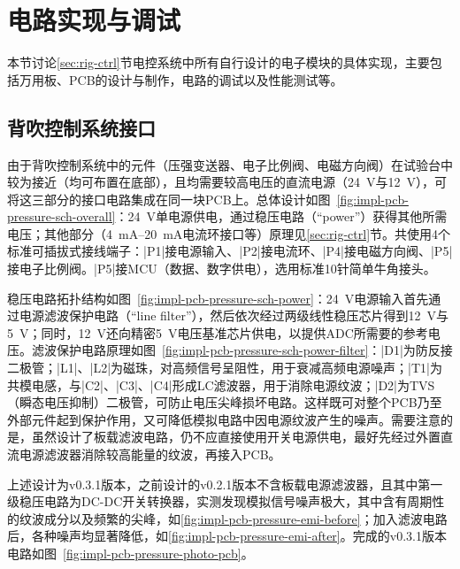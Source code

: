 \clearpage



\section{电路实现与调试}\label{sec:impl-pcb}

本节讨论\ref{sec:rig-ctrl}节电控系统中所有自行设计的电子模块的具体实现，主要包括万用板、PCB的设计与制作，电路的调试以及性能测试等。


\subsection{背吹控制系统接口}\label{sec:impl-pcb-pressure}

由于背吹控制系统中的元件（压强变送器、电子比例阀、电磁方向阀）在试验台中较为接近（均可布置在底部），且均需要较高电压的直流电源（\SI{+24}{\V}与\SI{+12}{\V}），可将这三部分的接口电路集成在同一块PCB上。总体设计如图~\ref{fig:impl-pcb-pressure-sch-overall}：\SI{+24}{\V}单电源供电，通过稳压电路（``power''）获得其他所需电压；其他部分（\SIrange{4}{20}{\mA}电流环接口等）原理见\ref{sec:rig-ctrl}节。共使用4个标准可插拔式接线端子：\bverb|P1|接电源输入、\bverb|P2|接电流环、\bverb|P4|接电磁方向阀、\bverb|P5|接电子比例阀。\bverb|P5|接MCU（数据、数字供电），选用标准10针简单牛角接头。

稳压电路拓扑结构如图~\ref{fig:impl-pcb-pressure-sch-power}：\SI{+24}{\V}电源输入首先通过电源滤波保护电路（``line filter''），然后依次经过两级线性稳压芯片得到\SI{+12}{\V}与\SI{+5}{\V}；同时，\SI{+12}{\V}还向精密\SI{+5}{\V}电压基准芯片供电，以提供ADC所需要的参考电压。滤波保护电路原理如图~\ref{fig:impl-pcb-pressure-sch-power-filter}：\bverb|D1|为防反接二极管；\bverb|L1|、\bverb|L2|为磁珠，对高频信号呈阻性，用于衰减高频电源噪声；\bverb|T1|为共模电感，与\bverb|C2|、\bverb|C3|、\bverb|C4|形成LC滤波器，用于消除电源纹波；\bverb|D2|为TVS（瞬态电压抑制）二极管，可防止电压尖峰损坏电路。这样既可对整个PCB乃至外部元件起到保护作用，又可降低模拟电路中因电源纹波产生的噪声。需要注意的是，虽然设计了板载滤波电路，仍不应直接使用开关电源供电，最好先经过外置直流电源滤波器消除较高能量的纹波，再接入PCB。

上述设计为v0.3.1版本，之前设计的v0.2.1版本不含板载电源滤波器，且其中第一级稳压电路为DC-DC开关转换器，实测发现模拟信号噪声极大，其中含有周期性的纹波成分以及频繁的尖峰，如\ref{fig:impl-pcb-pressure-emi-before}；加入滤波电路后，各种噪声均显著降低，如\ref{fig:impl-pcb-pressure-emi-after}。完成的v0.3.1版本电路如图~\ref{fig:impl-pcb-pressure-photo-pcb}。

